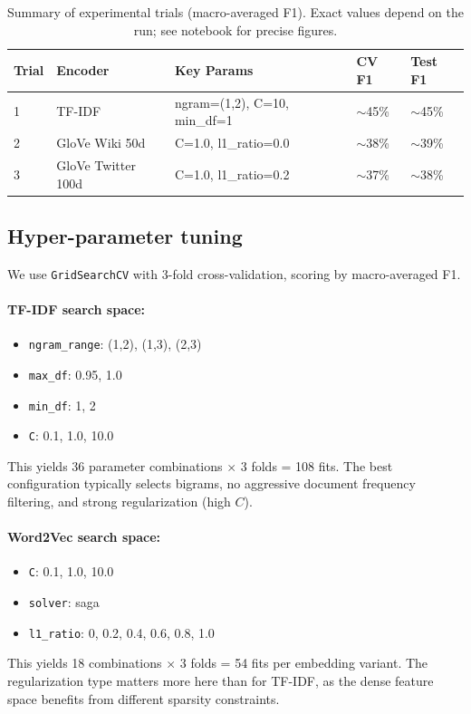 \documentclass[12pt]{fphw}
\begin{document}
\begin{table}[h]
\centering
\begin{tabular}{|l|l|l|l|l|}
\hline
\textbf{Trial} & \textbf{Encoder} & \textbf{Key Params} & \textbf{CV F1} & \textbf{Test F1} \\ \hline
1 & TF-IDF & ngram=(1,2), C=10, min\_df=1 & $\sim$45\% & $\sim$45\% \\ \hline
2 & GloVe Wiki 50d & C=1.0, l1\_ratio=0.0 & $\sim$38\% & $\sim$39\% \\ \hline
3 & GloVe Twitter 100d & C=1.0, l1\_ratio=0.2 & $\sim$37\% & $\sim$38\% \\ \hline
\end{tabular}
\caption{Summary of experimental trials (macro-averaged F1). Exact values depend on the run; see notebook for precise figures.}
\label{tab:trials}
\end{table}

\subsection{Hyper-parameter tuning}

We use \texttt{GridSearchCV} with 3-fold cross-validation, scoring by macro-averaged F1.

\paragraph{TF-IDF search space:}
\begin{itemize}
	\item \texttt{ngram\_range}: (1,2), (1,3), (2,3)
	\item \texttt{max\_df}: 0.95, 1.0
	\item \texttt{min\_df}: 1, 2
	\item \texttt{C}: 0.1, 1.0, 10.0
\end{itemize}
This yields 36 parameter combinations $\times$ 3 folds = 108 fits. The best configuration typically selects bigrams, no aggressive document frequency filtering, and strong regularization (high $C$).

\paragraph{Word2Vec search space:}
\begin{itemize}
	\item \texttt{C}: 0.1, 1.0, 10.0
	\item \texttt{solver}: saga
	\item \texttt{l1\_ratio}: 0, 0.2, 0.4, 0.6, 0.8, 1.0
\end{itemize}
This yields 18 combinations $\times$ 3 folds = 54 fits per embedding variant. The regularization type matters more here than for TF-IDF, as the dense feature space benefits from different sparsity constraints.
\end{document}
